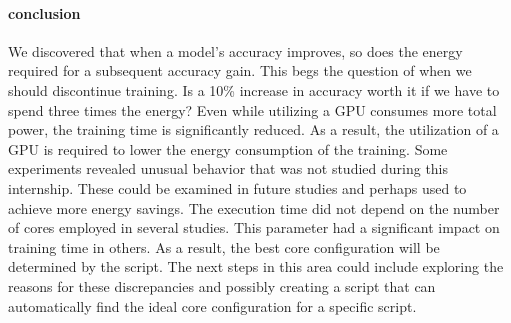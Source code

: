 \paragraph{conclusion}
We discovered that when a model's accuracy improves, so does the energy required for a subsequent accuracy gain.
This begs the question of when we should discontinue training.
Is a 10\% increase in accuracy worth it if we have to spend three times the energy?
Even while utilizing a GPU consumes more total power, the training time is significantly reduced.
As a result, the utilization of a GPU is required to lower the energy consumption of the training.
Some experiments revealed unusual behavior that was not studied during this internship.
These could be examined in future studies and perhaps used to achieve more energy savings.
The execution time did not depend on the number of cores employed in several studies.
This parameter had a significant impact on training time in others.
As a result, the best core configuration will be determined by the script.
The next steps in this area could include exploring the reasons for these discrepancies and possibly creating a script that can automatically find the ideal core configuration for a specific script.





